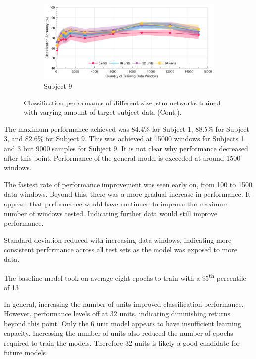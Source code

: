 \begin{figure}[t]\ContinuedFloat
    \begin{subfigure}[b]{\textwidth}
        \centering
        \includegraphics[width=\textwidth]{content/5-Personalisation/Bespoke_Target/ch5_bespoke_target_model_subject_9.pdf}
        \caption{Subject 9}
        \label{fig:ch5_32_unit_bespoke_model}
    \end{subfigure}
    \caption[]{Classification performance of different size \acrshort{lstm} networks trained with varying amount of target subject data (Cont.).}
\end{figure}

The maximum performance achieved was $84.4\%$ for Subject 1, $88.5\%$ for Subject 3, and $82.6\%$ for Subject 9. This was achieved at 15000 windows for Subjects 1 and 3 but 9000 samples for Subject 9. It is not clear why performance decreased after this point. Performance of the general model is exceeded at around 1500 windows.

The fastest rate of performance improvement was seen early on, from 100 to 1500 data windows. Beyond this, there was a more gradual increase in performance. It appears that performance would have continued to improve the maximum number of windows tested. Indicating further data would still improve performance. 

Standard deviation reduced with increasing data windows, indicating more consistent performance across all test sets as the model was exposed to more data.

The baseline model took on average eight epochs to train with a 95\textsuperscript{th} percentile of 13

In general, increasing the number of units improved classification performance. However, performance levels off at 32 units, indicating diminishing returns beyond this point. Only the 6 unit model appears to have insufficient learning capacity. Increasing the number of units also reduced the number of epochs required to train the models. Therefore 32 units is likely a good candidate for future models.

